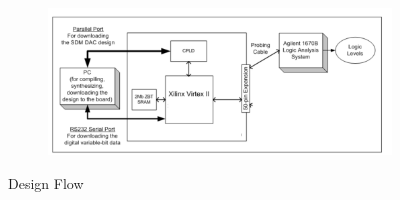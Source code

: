 \documentclass{FR16}
\begin{document}
  \begin{figure}[H]
 
    \begin{subfigure}{\textwidth}
    \includegraphics[scale=0.5]{Pictorial_dipiction.png} 
    \label{fig:DJp1}
    \end{subfigure}
 
 \caption{Design Flow}
\label{fig6}
\end{figure}
    
\end{document}
